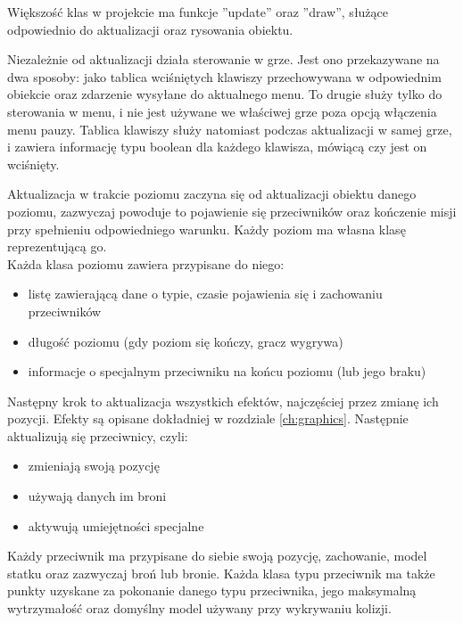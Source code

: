 Większo\'sć klas w projekcie ma funkcje ''update'' oraz ''draw'', służące odpowiednio do aktualizacji oraz rysowania obiektu.

Niezależnie od aktualizacji działa sterowanie w grze. Jest ono przekazywane na dwa sposoby: jako tablica wci\'sniętych klawiszy przechowywana w odpowiednim obiekcie oraz zdarzenie wysyłane do aktualnego menu. To drugie służy tylko do sterowania w menu, i nie jest używane we wła\'sciwej grze poza opcją włączenia menu pauzy. Tablica klawiszy służy natomiast podczas aktualizacji w samej grze, i zawiera informację typu boolean dla każdego klawisza, mówiącą czy jest on wci\'snięty.\bigskip

\smallskip

Aktualizacja w trakcie poziomu zaczyna się od aktualizacji obiektu danego poziomu, zazwyczaj powoduje to pojawienie się przeciwników oraz kończenie misji przy spełnieniu odpowiedniego warunku. Każdy poziom ma własna klasę reprezentującą go.\\
Każda klasa poziomu zawiera przypisane do niego: \begin{itemize}[topsep=0.2em, itemsep=0.5em, partopsep=0em, parsep=0em]
	\item listę zawierającą dane o typie, czasie pojawienia się i zachowaniu przeciwników
	\item długo\'sć poziomu (gdy poziom się kończy, gracz wygrywa)
	\item informacje o specjalnym przeciwniku na końcu poziomu (lub jego braku)
\end{itemize}\smallskip

\noindent Następny krok to aktualizacja wszystkich efektów, najczę\'sciej przez zmianę ich pozycji. Efekty są opisane dokładniej w rozdziale \ref{ch:graphics}.\newpage
\noindent Następnie aktualizują się przeciwnicy, czyli:\begin{itemize}[topsep=0.2em, itemsep=0.5em, partopsep=0em, parsep=0em]
	\item zmieniają swoją pozycję
	\item używają danych im broni
	\item aktywują umiejętno\'sci specjalne
\end{itemize}
Każdy przeciwnik ma przypisane do siebie swoją pozycję, zachowanie, model statku oraz zazwyczaj broń lub bronie. Każda klasa typu przeciwnik ma także punkty uzyskane za pokonanie danego typu przeciwnika, jego maksymalną wytrzymało\'sć  oraz domy\'slny model używany przy wykrywaniu kolizji.\smallskip

